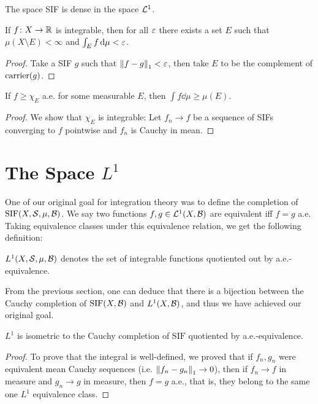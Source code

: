 \begin{corollary}
    The space SIF is dense in the space $\mathcal L^1$.
\end{corollary}

\begin{lemma}
    If $f \colon X \to \mathbb R$ is integrable, then for all $\varepsilon$ there exists a set $E$ such that $\mu(X \setminus E) < \infty$ and $\int_E f \dd{\mu} < \varepsilon$.
\end{lemma}

\begin{proof}
    Take a SIF $g$ such that $\norm{f - g}_1 < \varepsilon$, then take $E$ to be the complement of $\operatorname{carrier}(g)$.
\end{proof}

\begin{lemma}
    If $f \ge \chi_E$ a.e. for some measurable $E$, then $\int f \dd{\mu} \ge \mu(E)$.
\end{lemma}

\begin{proof}
    We show that $\chi_E$ is integrable: Let $f_n \to f$ be a sequence of SIFs converging to $f$ pointwise and $f_n$ is Cauchy in mean. 
\end{proof}

\section{The Space $L^1$}

One of our original goal for integration theory was to define the completion of $\mathrm{SIF}(X, \mathcal S, \mu, \mathcal B)$. We say two functions $f, g \in \mathcal L^1(X, \mathcal B)$ are equivalent iff $f = g$ a.e. Taking equivalence classes under this equivalence relation, we get the following definition:

\begin{definition}
    $L^1(X, \mathcal S, \mu, \mathcal B)$ denotes the set of integrable functions quotiented out by a.e.-equivalence. 
\end{definition}

From the previous section, one can deduce that there is a bijection between the Cauchy completion of $\mathrm{SIF}(X, \mathcal B)$ and $L^1(X, \mathcal B)$, and thus we have achieved our original goal.

\begin{theorem}
    $L^1$ is isometric to the Cauchy completion of $\mathrm{SIF}$ quotiented by a.e.-equivalence.
\end{theorem}

\begin{proof}
    To prove that the integral is well-defined, we proved that if $f_n, g_n$ were equivalent mean Cauchy sequences (i.e. $\norm{f_n - g_n}_1 \to 0$), then if $f_n \to f$ in measure and $g_n \to g$ in measure, then $f = g$ a.e., that is, they belong to the same one $L^1$ equivalence class.
\end{proof}

